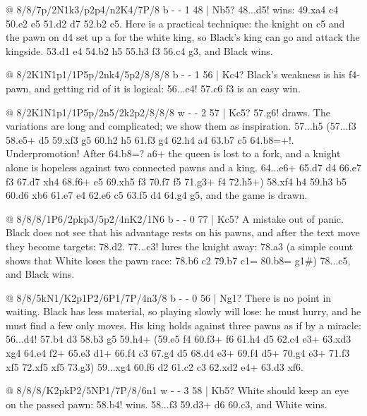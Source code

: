 @ 8/8/7p/2N1k3/p2p4/n2K4/7P/8 b - - 1 48 | Nb5?
48...\K d5! wins: 49.\N xa4 \N c4 50.\K e2 \N e5 51.\K d2 \N d7 52.\N b2 \N c5. Here is a practical
technique: the knight on c5 and the pawn on d4 set up a  for the white
king, so Black's king can go and attack the kingside. 53.\N d1 \K e4 54.\N b2 h5 55.h3 \K f3
56.\N c4 \K g3, and Black wins.

@ 8/2K1N1p1/1P5p/2nk4/5p2/8/8/8 b - - 1 56 | Kc4?
Black's weakness is his f4-pawn, and getting rid of it is logical:
56...\K e4! 57.\K c6 f3 is an easy win.

@ 8/2K1N1p1/1P5p/2n5/2k2p2/8/8/8 w - - 2 57 | Kc5?
57.\N g6! draws. The variations are long and complicated; we show them as inspiration.
57...h5 (57...f3 58.\N e5+ \K d5 59.\N xf3 g5 60.\N h2 h5 61.\N f3 g4 62.\N h4 \N a4 63.b7 \N c5
64.b8=\N+!. Underpromotion! After 64.b8=\Q? \N a6+ the queen is lost to a
fork, and a knight alone is hopeless against two connected pawns and a king. 64...\N e6+ 65.\K d7
\N d4 66.\K e7 \N f3 67.\N d7 \N xh4 68.\N f6+ \K e5 69.\N xh5 \N f3 70.\K f7 \K f5 71.\N g3+ \K f4
72.\N h5+) 58.\N xf4 h4 59.\N h3 \K b5 60.\K d6 \K xb6 61.\K e7 \N e4 62.\K e6 \K c5 63.\K f5 \K d4
64.\K g4 g5, and the game is drawn.

@ 8/8/8/1P6/2pkp3/5p2/4nK2/1N6 b - - 0 77 | Kc5?
A mistake out of panic. Black does not see that his advantage rests on his pawns, and after the
text move they become targets: 78.\N d2. 77...c3! lures the knight away: 78.\N a3 (a simple count
shows that White loses the pawn race: 78.b6 c2 79.b7 c1=\Q{} 80.b8=\Q{} \Q g1\#) 78...\K c5, and
Black wins.

@ 8/8/5kN1/K2p1P2/6P1/7P/4n3/8 b - - 0 56 | Ng1?
There is no point in waiting. Black has less material, so playing slowly will lose: he must hurry,
and he must find a few only moves. His king holds against three pawns as if by a miracle:
56...d4! 57.\K b4 d3 58.\K b3 \K g5 59.h4+ (59.\N e5 \N f4 60.\N f3+ \K f6 61.h4 \N d5 62.\K c4
\N e3+ 63.\K xd3 \N xg4 64.\K e4 \N f2+ 65.\K e3 \N d1+ 66.\K f4 \N c3 67.\K g4 \N d5 68.\N d4
\N e3+ 69.\K f4 \N d5+ 70.\K g4 \N e3+ 71.\K f3 \N xf5 72.\N xf5 \K xf5 73.\K g3) 59...\K xg4 60.f6
d2 61.\K c2 \N c3 62.\K xd2 \N e4+ 63.\K d3 \N xf6.

@ 8/8/8/K2pkP2/5NP1/7P/8/6n1 w - - 3 58 | Kb5?
White should keep an eye on the passed pawn: 58.\K b4! wins. 58...\N f3 59.\N d3+ \K d6 60.\K c3, and White wins.

